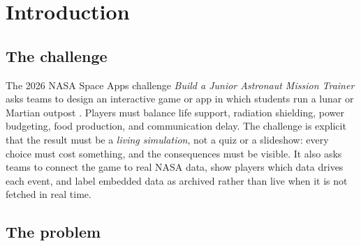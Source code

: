 \documentclass[11pt,a4paper]{article}
\begin{document}
\begin{abstract}
ASTRO is a browser-based educational simulation for children aged 7--12. The player commands a four-person lunar outpost and must balance energy, oxygen, radiation, food, and science across four mission days. Every choice has a cost, and every consequence is explained with a real NASA fact and its source. The simulation combines NASA reference values (BVAD consumables, Chang'e-4 surface dose, NASA-STD-3001 limits, DONKI event structure, OSDR/RadLab context) with a compact Random Forest surrogate trained on 6,000 synthetic scenarios and exported to plain JavaScript. The entire experience runs offline in a single HTML file, with two age modes, text-to-speech, a glossary, keyboard navigation, reduced-motion support, and a teacher guide. This report documents the problem, the design, the scientific and pedagogical foundations, the machine-learning pipeline, the architecture, the evaluation plan, and the limitations of the prototype.
\end{abstract}

\tableofcontents
\newpage

\section{Introduction}

\subsection{The challenge}

The 2026 NASA Space Apps challenge \emph{Build a Junior Astronaut Mission Trainer} asks teams to design an interactive game or app in which students run a lunar or Martian outpost \cite{spaceapps2026}. Players must balance life support, radiation shielding, power budgeting, food production, and communication delay. The challenge is explicit that the result must be a \emph{living simulation}, not a quiz or a slideshow: every choice must cost something, and the consequences must be visible. It also asks teams to connect the game to real NASA data, show players which data drives each event, and label embedded data as archived rather than live when it is not fetched in real time.

\subsection{The problem}
\end{document}
